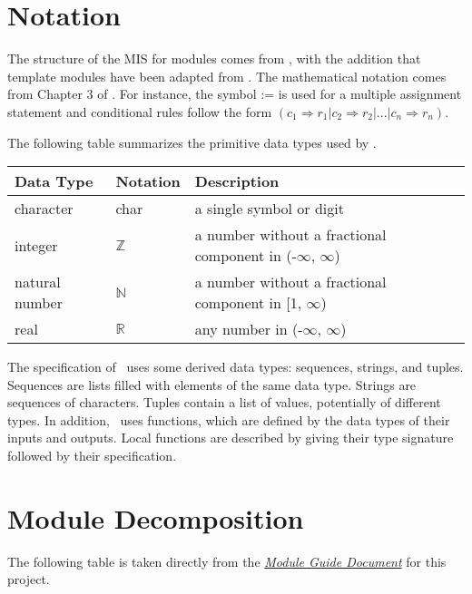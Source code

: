 \documentclass[12pt, titlepage]{article}
\begin{document}
\section{Notation}



The structure of the MIS for modules comes from \citet{HoffmanAndStrooper1995},
with the addition that template modules have been adapted from
\cite{GhezziEtAl2003}.  The mathematical notation comes from Chapter 3 of
\citet{HoffmanAndStrooper1995}.  For instance, the symbol := is used for a
multiple assignment statement and conditional rules follow the form $(c_1
\Rightarrow r_1 | c_2 \Rightarrow r_2 | ... | c_n \Rightarrow r_n )$.

The following table summarizes the primitive data types used by \progname. 

\begin{center}
\renewcommand{\arraystretch}{1.2}
\noindent 
\begin{tabular}{l l p{7.5cm}} 
\toprule 
\textbf{Data Type} & \textbf{Notation} & \textbf{Description}\\ 
\midrule
character & char & a single symbol or digit\\
integer & $\mathbb{Z}$ & a number without a fractional component in (-$\infty$, $\infty$) \\
natural number & $\mathbb{N}$ & a number without a fractional component in [1, $\infty$) \\
real & $\mathbb{R}$ & any number in (-$\infty$, $\infty$)\\
\bottomrule
\end{tabular} 
\end{center}

\noindent
The specification of \progname \ uses some derived data types: sequences, strings, and
tuples. Sequences are lists filled with elements of the same data type. Strings
are sequences of characters. Tuples contain a list of values, potentially of
different types. In addition, \progname \ uses functions, which
are defined by the data types of their inputs and outputs. Local functions are
described by giving their type signature followed by their specification.

\section{Module Decomposition}

The following table is taken directly from the \href{https://github.com/jordanbierbrier/capstone/blob/main/docs/Design/SoftArchitecture/MG.pdf}{\textit{Module Guide Document}} for this project.
\end{document}
